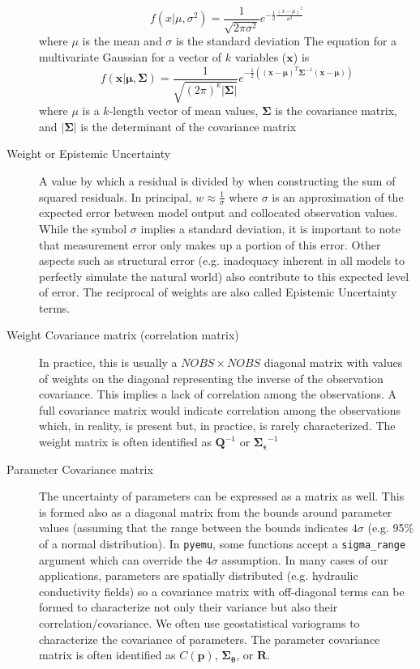 \documentclass[english]{article}
\begin{document}
\begin{description}
\begin{equation}
f(x|\mu,\sigma^2)=\frac{1}{\sqrt{2\pi\sigma^2}}e^{-\frac{1}{2}\frac{\left(x-\mu\right)^2}{\sigma^2}}
\end{equation}
where $\mu$ is the mean and $\sigma$ is the standard deviation
The equation for a multivariate Gaussian for a vector of $k$ variables ($\mathbf{x}$) is
\begin{equation}
f(\mathbf{x} | \mathbf{\mu},\mathbf{\Sigma})=\frac{1}{\sqrt{(2\pi)^k\left|\mathbf{\Sigma}\right|}}e^{-\frac{1}{2}\left( \left(\mathbf{x}-\mathbf{\mu} \right)^T  \mathbf{\Sigma}^{-1}\left(\mathbf{x}-\mathbf{\mu} \right)\right)}
\end{equation}
where $\mu$ is a $k$-length vector of mean values, $\mathbf{\Sigma}$ is the covariance matrix, and $\left|\mathbf{\Sigma}\right|$ is the determinant of the covariance matrix
\item [Weight or Epistemic Uncertainty] A value by which a residual is divided by when constructing the sum of squared residuals. In principal, $w\approx\frac{1}{\sigma}$ where $\sigma$ is an approximation of the expected error between model output and collocated observation values. While the symbol $\sigma$ implies a standard deviation, it is important to note that measurement error only makes up a portion of this error. Other aspects such as structural error (e.g. inadequacy inherent in all models to perfectly simulate the natural world) also contribute to this expected level of error. The reciprocal of weights are also called Epistemic Uncertainty terms.
\item [Weight Covariance matrix (correlation matrix)] In practice, this is usually a $NOBS\times NOBS$ diagonal matrix with values of weights on the diagonal representing the inverse of the observation covariance. This implies a lack of correlation among the observations. A full covariance matrix would indicate correlation among the observations which, in reality, is present but, in practice, is rarely characterized. The weight matrix is often identified as $\mathbf{Q}^{-1}$ or $\mathbf{\Sigma_\epsilon}^{-1}$
\item [Parameter Covariance matrix] The uncertainty of parameters can be expressed as a matrix as well. This is formed also as a diagonal matrix from the bounds around parameter values (assuming that the range between the bounds indicates $4\sigma$ (e.g. 95\% of a normal distribution). In \texttt{pyemu}, some functions accept a \texttt{sigma\_range} argument which can override the $4\sigma$ assumption. In many cases of our applications, parameters are spatially distributed (e.g. hydraulic conductivity fields) so a covariance matrix with off-diagonal terms can be formed to characterize not only their variance but also their correlation/covariance. We often use geostatistical variograms to characterize the covariance of parameters. The parameter covariance matrix is often identified as $C(\mathbf{p})$, $\mathbf{\Sigma_\theta}$, or $\mathbf{R}$.

\end{description}
\end{document}
